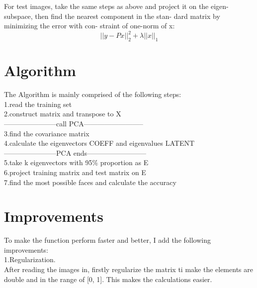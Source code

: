 \documentclass[sigconf]{acmart}
\begin{document}
For test images, take the same steps as above and project it on the eigen-subspace, then find the nearest component in the stan- dard matrix by minimizing the error with con- straint of one-norm of x:
\begin{displaymath}
	||y - Px||_2^2 + \lambda||x||_1
\end{displaymath}
\section{Algorithm}

The Algorithm is mainly comprised of the following steps:\\

	1.read the training set\\
    
	2.construct matrix and transpose to X\\
    
	-----------------------call PCA--------------------------\\
    
	3.find the covariance matrix\\
    
	4.calculate the eigenvectors COEFF and eigenvalues LATENT\\
    
	-----------------------PCA ends--------------------------\\
    
	5.take k eigenvectors with 95\% proportion as E\\
    
	6.project training matrix and test matrix on E\\
    
    7.find the most possible faces and calculate the accuracy\\
    
\section{Improvements}

To make the function perform faster and better, I add the following improvements:\\

	1.Regularization.\\
    
    After reading the images in, firstly regularize the matrix ti make the elements are double and in the range of [0, 1]. This makes the calculations easier.\\
    
\end{document}

